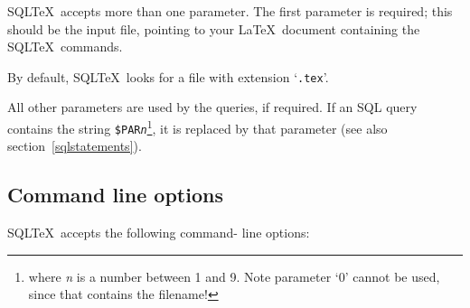 \documentclass{article}
\newcommand{\vs}{\vspace{3mm}}
\begin{document}
SQL\TeX\ accepts more than one parameter. The first parameter is required; this should
be the input file, pointing to your \LaTeX\ document containing the SQL\TeX\ commands.

By default, SQL\TeX\ looks for a file with extension `\texttt{.tex}'.

\vs

All other parameters are used by the queries, if required. If an SQL query contains the
string \texttt{\$PAR\textit{n}}\footnote{where \textit{n} is a number between 1 and 9. Note 
parameter `0' cannot be used, since that contains the filename!}, it is replaced by that parameter
(see also section~\ref{sqlstatements}).

\subsection{Command line options}\label{cmdline}

SQL\TeX\ accepts the following command- line options:
\end{document}
